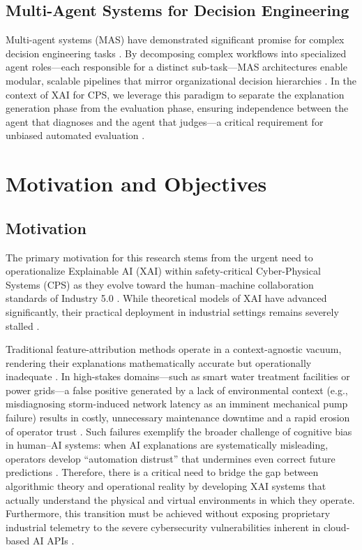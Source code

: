 \documentclass[a4paper,fleqn]{cas-dc}
\begin{document}
\subsection{Multi-Agent Systems for Decision Engineering}
Multi-agent systems (MAS) have demonstrated significant promise for complex decision engineering tasks \cite{ref22, ref23}. By decomposing complex workflows into specialized agent roles---each responsible for a distinct sub-task---MAS architectures enable modular, scalable pipelines that mirror organizational decision hierarchies \cite{ref_autogen}. In the context of XAI for CPS, we leverage this paradigm to separate the explanation generation phase from the evaluation phase, ensuring independence between the agent that diagnoses and the agent that judges---a critical requirement for unbiased automated evaluation \cite{ref_llm_judge}.

\section{Motivation and Objectives}

\subsection{Motivation}
The primary motivation for this research stems from the urgent need to operationalize Explainable AI (XAI) within safety-critical Cyber-Physical Systems (CPS) as they evolve toward the human--machine collaboration standards of Industry 5.0 \cite{ref38}. While theoretical models of XAI have advanced significantly, their practical deployment in industrial settings remains severely stalled \cite{ref13}. 

Traditional feature-attribution methods operate in a context-agnostic vacuum, rendering their explanations mathematically accurate but operationally inadequate \cite{ref16, ref26}. In high-stakes domains---such as smart water treatment facilities or power grids---a false positive generated by a lack of environmental context (e.g., misdiagnosing storm-induced network latency as an imminent mechanical pump failure) results in costly, unnecessary maintenance downtime and a rapid erosion of operator trust \cite{ref6, ref8}. Such failures exemplify the broader challenge of cognitive bias in human--AI systems: when AI explanations are systematically misleading, operators develop ``automation distrust'' that undermines even correct future predictions \cite{ref_cognitive_bias}. Therefore, there is a critical need to bridge the gap between algorithmic theory and operational reality by developing XAI systems that actually understand the physical and virtual environments in which they operate. Furthermore, this transition must be achieved without exposing proprietary industrial telemetry to the severe cybersecurity vulnerabilities inherent in cloud-based AI APIs \cite{ref10}.
\end{document}
